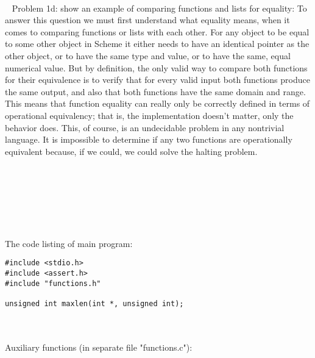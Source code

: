 \documentclass{article}
\begin{document}
\paragraph{}\
\rmfamily
Problem 1d: show an example of comparing functions and lists for equality:
\newline
\newline
To answer this question we must first understand what equality means, when it comes to comparing functions or lists with each other. For any object to be equal to some other object in Scheme it either needs to have an identical pointer as the other object, or to have the same type and value, or to have the same, equal numerical value. But by definition, the only valid way to compare both functions for their equivalence is to verify that for every valid input both functions produce the same output, and also that both functions have the same domain and range. This means that function equality can really only be correctly defined in terms of operational equivalency; that is, the implementation doesn't matter, only the behavior does. This, of course, is an undecidable problem in any nontrivial language. It is impossible to determine if any two functions are operationally equivalent because, if we could, we could solve the halting problem.


\paragraph{}\
\paragraph{}\
\paragraph{}\

		\rmfamily
		\noindent The code listing of main program:
		\begin{verbatim}
#include <stdio.h>
#include <assert.h>
#include "functions.h"

unsigned int maxlen(int *, unsigned int);
		\end{verbatim}


\paragraph{}\

	\rmfamily
	
	Auxiliary functions (in separate file "functions.c"):
	
\end{document}
